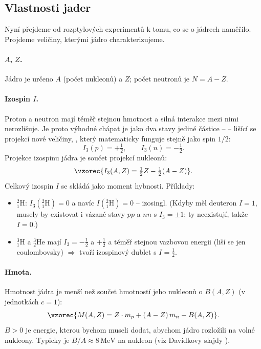 \subsection{Vlastnosti jader}

Nyní přejdeme od rozptylových experimentů k tomu, co se o jádrech naměřilo.
Projdeme veličiny, kterými jádro charakterizujeme.

\paragraph{\(A\), \(Z\).} Jádro je určeno  \(A\)
(počet nukleonů) a  \(Z\); počet neutronů
je \(N=A-Z\).

\paragraph{Izospin \(I\).} Proton a neutron mají téměř stejnou hmotnost
a silná interakce mezi nimi nerozlišuje. Je proto výhodné chápat je jako dva
stavy jediné částice --  -- lišící se projekcí nové
 veličiny, , který matematicky funguje stejně
jako spin \(1/2\):
\[
  I_3(p) = +\tfrac12, \qquad I_3(n) = -\tfrac12 .
\]
Projekce izospinu jádra je součet projekcí nukleonů:
\[
  \vzorec{I_3(A,Z) = \tfrac12 Z - \tfrac12 (A-Z)} .
\]
Celkový izospin \(I\) se skládá jako moment hybnosti. Příklady:
\begin{itemize}
  \item {} \({}^{2}_{1}\mathrm{H}\): \(I_3({}^{2}_{1}\mathrm{H}) = 0\)
    a navíc \(I({}^{2}_{1}\mathrm{H}) = 0\) -- izosingl. (Kdyby měl deuteron
    \(I=1\), musely by existovat i vázané stavy \(pp\) a \(nn\) s \(I_3=\pm1\);
    ty neexistují, takže \(I=0\).)
  \item \({}^{3}_{1}\mathrm{H}\) a \({}^{3}_{2}\mathrm{He}\) mají
    \(I_3 = -\tfrac12\) a \(+\tfrac12\) a téměř stejnou vazbovou energii
    (liší se jen coulombovsky) \(\Rightarrow\) tvoří izospinový dublet
    s \(I=\tfrac12\).
\end{itemize}

\paragraph{Hmota.} Hmotnost jádra je menší než součet hmotností jeho
nukleonů o  \(B(A,Z)\) (v jednotkách \(c=1\)):
\[
  \vzorec{M(A,Z) = Z\cdot m_p + (A-Z)\,m_n - B(A,Z)} .
\]
\(B>0\) je energie, kterou bychom museli dodat, abychom jádro rozložili na
volné nukleony. Typicky je \(B/A\approx 8\,\mathrm{MeV}\) na nukleon (viz
Davídkovy slajdy ).


